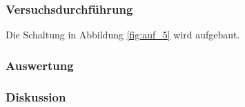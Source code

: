 \documentclass[12pt,a4paper]{article}
\begin{document}
\subsubsection*{Versuchsdurchführung}

Die Schaltung in Abbildung \ref{fig:auf_5} wird aufgebaut.

\subsubsection*{Auswertung}
\subsubsection*{Diskussion}
\end{document}
